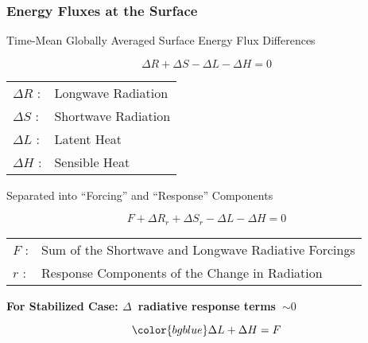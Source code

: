 \documentclass{beamer}
\begin{document}
\begin{frame}
\frametitle{Energy Fluxes at the Surface}
	\begin{center}
		Time-Mean Globally Averaged Surface Energy Flux Differences
	\end{center}
	\begin{equation*}
	\Delta R + \Delta S - \Delta L - \Delta H = 0
	\end{equation*}
	{\footnotesize
	\begin{tabular}{l l}
		$\Delta R$ : & Longwave Radiation\\
		$\Delta S$ : & Shortwave Radiation\\
		$\Delta L$ : & Latent Heat\\
		$\Delta H$ : & Sensible Heat
	\end{tabular}}
	\begin{center}
		Separated into ``Forcing'' and ``Response'' Components
	\end{center}
	\begin{equation*}
	F + \Delta R_r + \Delta S_r - \Delta L - \Delta H = 0
	\end{equation*}
	{\footnotesize
	\begin{tabular}{l l}
		$F$ : & Sum of the Shortwave and Longwave Radiative Forcings\\
		$r$ : & Response Components of the Change in Radiation
	\end{tabular}}
	\begin{center}
	{\bf\color{bgblue} For Stabilized Case: $\Delta$~radiative response terms~$\sim0$}
	\end{center}
	\begin{equation*}
	{\color{bgblue}\Delta L + \Delta H = F}
	\end{equation*}
\end{frame}

\end{document}
